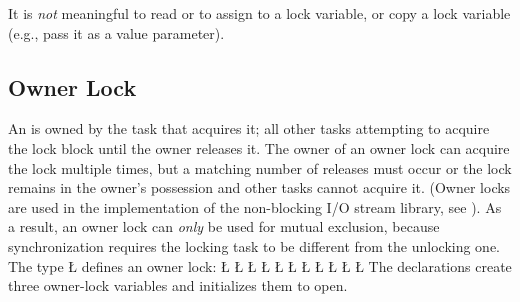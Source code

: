 \documentclass[openright,twoside]{report}
\begin{document}
It is \emph{not} meaningful to read or to assign to a lock variable, or copy a lock variable (e.g., pass it as a value parameter).


\subsection{Owner Lock}
\label{s:OwnerLock}

An  is owned by the task that acquires it;
all other tasks attempting to acquire the lock block until the owner releases it.
The owner of an owner lock can acquire the lock multiple times, but a matching number of releases must occur or the lock remains in the owner's possession and other tasks cannot acquire it.
(Owner locks are used in the implementation of the non-blocking I/O stream library, see ).
As a result, an owner lock can \emph{only} be used for mutual exclusion, because synchronization requires the locking task to be different from the unlocking one.
The type \LGinlinetrue\LGbegin\lgrinde\L{}\endlgrinde\LGend{} defines an owner lock:
\LGinlinefalse\LGbegin\lgrinde
\L{}
\L{}
\L{\LB{}}
\L{\LB{}}
\L{\LB{}}
\L{\LB{}}
\L{\LB{}}
\L{\LB{}}
\L{\LB{\};}}
\L{}
\L{}
\endlgrinde\LGend
{}%
%
%
%
%
The declarations create three owner-lock variables and initializes them to open.
\end{document}
